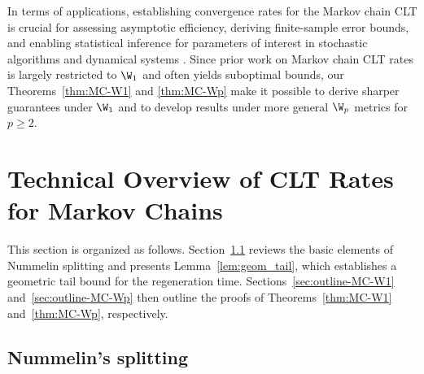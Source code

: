 \documentclass[mnsc,nonblindrev]{informs3}
\begin{document}
In terms of applications, establishing convergence rates for the Markov chain
CLT is crucial for assessing asymptotic efficiency, deriving finite-sample error
bounds, and enabling statistical inference for parameters of interest in
stochastic algorithms and dynamical systems
\citep{srikant2024rates,samsonov2024gaussian,wu2025uncertainty}. Since prior work
on Markov chain CLT rates is largely restricted to $\W_1$ and often yields suboptimal
bounds, our Theorems~\ref{thm:MC-W1} and \ref{thm:MC-Wp} make it possible to
derive sharper guarantees under $\W_1$ and to develop results under more general $\W_p$
metrics for $p\ge 2$.


\section{Technical Overview of CLT Rates for Markov Chains}\label{sec:outline-berry}
This section is organized as follows. Section~\ref{sec:splitchain} reviews the
basic elements of Nummelin splitting \citep{nummelin1978splitting,Meyn12_book} and
presents Lemma~\ref{lem:geom_tail}, which establishes a  geometric tail bound for
the regeneration time. Sections~\ref{sec:outline-MC-W1} and~\ref{sec:outline-MC-Wp}
then outline the proofs of Theorems~\ref{thm:MC-W1} and~\ref{thm:MC-Wp},
respectively.
\subsection{Nummelin's splitting}\label{sec:splitchain}
\end{document}
